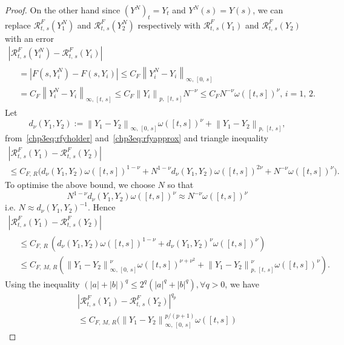 \documentclass[AHL,Unicode,longabstracts,published]{cedram}
\newcommand{\calR}{\mathcal{R}}
\let\oldforall\forall
\renewcommand*{\forall}{\mathrel{\oldforall}}
\begin{document}
\begin{proof}
On the other hand since $(Y^N)_t=Y_t$ and $Y^N(s)=Y(s)$, we can replace $\calR^{F}_{t,\,s}(Y^N_1)$ and $\calR^{F}_{t,\,s}(Y^N_2)$ respectively with $\calR^{F}_{t,\,s}(Y_1)$ and $\calR^{F}_{t,\,s}(Y_2)$ with an error
\begin{multline}\label{chp3eq:rfyapprox}
\left|\calR^{F}_{t,\,s}\left(Y^N_i\right)-\calR^{F}_{t,\,s}(Y_i)\right|\\
\begin{aligned}
&=\left|F\left(s,Y^N_{i}\right)-F\left(s,Y_{i}\right)\right|
\leq C_F\left\|Y^N_{i}-Y_{i}\right\|_{\infty,\,[0,\,s]}\\
&=C_F\left\|Y^N_{i}-Y_{i}\right\|_{\infty,\,[t,\, s]}\leq C_F\left\|Y_{i}\right\|_{p,\,[t,\,s]}N^{-\nu}\leq C_FN^{-\nu} \omega([t,s])^{\nu},\, i=1,\, 2.
\end{aligned}
\end{multline}
Let
\[
d_{\nu}\left(Y_1,Y_2\right):= \left\|Y_1-Y_2\right\|_{\infty,\,[0,\,s]} \omega([t,s])^{\nu}+\left\|Y_1-Y_2\right\|_{p, \,[t,\,s]},
\]
from~\eqref{chp3eq:rfyholder} and~\eqref{chp3eq:rfyapprox} and triangle inequality
\begin{multline*}
\left|\calR^{F}_{t,\,s}(Y_1)-\calR^{F}_{t,\,s}(Y_2)\right|\\
\leq C_{F,\,R}
\big(d_{\nu}\left(Y_1,Y_2\right) \omega([t,s])^{1-\nu}
+N^{1-\nu}d_{\nu}\left(Y_1,Y_2\right) \omega([t,s])^{2\nu}+N^{-\nu} \omega([t,s])^{\nu}\big).
\end{multline*}
To optimise the above bound, we choose $N$ so that
\[
N^{1-\nu} d_{\nu}(Y_1,Y_2) \omega([t,s])^{\nu}\approx N^{-\nu} \omega([t,s])^{\nu}
\]
i.e. $ N\approx d_{\nu}(Y_1,Y_2)^{-1}. $ Hence
\begin{multline*}
\left|\calR^{F}_{t,\,s}(Y_1)-\calR^{F}_{t,\,s}(Y_2)\right|\\
\begin{aligned}
&\leq C_{F,\,R}\,
\left(d_{\nu}(Y_1,Y_2) \omega([t,s])^{1-\nu} + d_{\nu}(Y_1,Y_2)^{\nu} \omega([t,s])^{\nu}\right)\\
&\leq C_{F,\,M,\,R}\left(\left\|Y_1-Y_2\right\|^{\nu}_{\infty,\,[0,\,s]} \omega([t,s])^{\nu+\nu^2}+\left\|Y_1-Y_2\right\|_{p,\,[t,\,s]}^{\nu} \omega([t,s])^{\nu} \right).
\end{aligned}
\end{multline*}
Using the inequality $(|a|+|b|)^q\leq 2^{q}(|a|^q+|b|^q), \forall q>0$, we have
\begin{multline*}
\left|\calR^{F}_{t,\,s}(Y_1)-\calR^{F}_{t,\,s}(Y_2)\right|^{q_p}\\
\leq C_{F,\,M,\,R}\Big(\left\|Y_1-Y_2\right\|^{p/(p+1)}_{\infty,\,[0,\,s]} \omega([t,s])

\end{multline*}
\end{proof}
\end{document}
